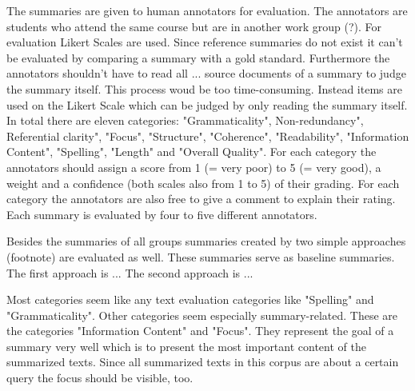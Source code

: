 The summaries are given to human annotators for evaluation. The annotators are students who attend the same course but are in another work group (?). For evaluation Likert Scales are used. Since reference summaries do not exist it can't be evaluated by comparing a summary with a gold standard. Furthermore the annotators shouldn't have to read all ... source documents of a summary to judge the summary itself. This process woud be too time-consuming. Instead items are used on the Likert Scale which can be judged by only reading the summary itself. In total there are eleven categories: "Grammaticality", Non-redundancy", Referential clarity", "Focus", "Structure", "Coherence", "Readability", "Information Content", "Spelling", "Length" and "Overall Quality". For each category the annotators should assign a score from 1 (= very poor) to 5 (= very good), a weight and a confidence (both scales also from 1 to 5) of their grading. For each category the annotators are also free to give a comment to explain their rating. Each summary is evaluated by four to five different annotators.

Besides the summaries of all groups summaries created by two simple approaches (footnote) are evaluated as well. These summaries serve as baseline summaries. The first approach is ... The second approach is ... 


Most categories seem like any text evaluation categories like "Spelling" and "Grammaticality". Other categories seem especially summary-related. These are the categories "Information Content" and "Focus". They represent the goal of a summary very well which is to present the most important content of the summarized texts. Since all summarized texts in this corpus are about a certain query the focus should be visible, too.

